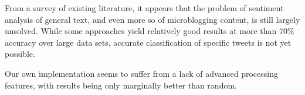 \documentclass{sig-alternate}
\begin{document}
From a survey of existing literature, it appears that the problem of sentiment analysis of general text, and even more so of microblogging content, is still largely unsolved. While some approaches yield relatively good results at more than $70\%$ accuracy over large data sets, accurate classification of specific tweets is not yet possible.

Our own implementation seems to suffer from a lack of advanced processing features, with results being only marginally better than random.



%


%
%
\end{document}
